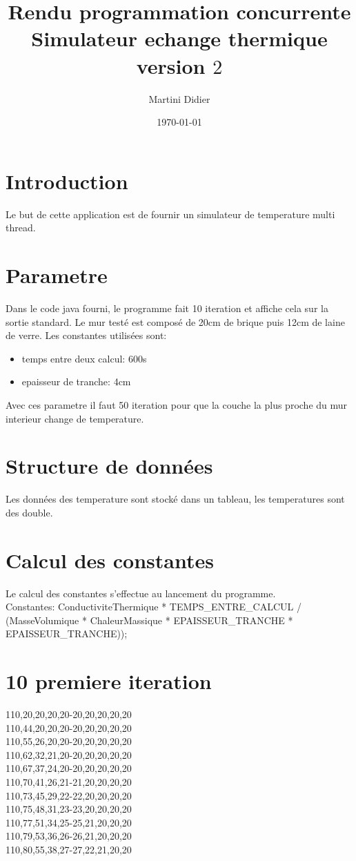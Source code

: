 \documentclass[11pt,a4paper]{article}
\title{Rendu programmation concurrente \\ Simulateur echange thermique version $2$}
\author{Martini Didier}
\date{\today}
\begin{document}
\maketitle

\section{Introduction}
Le but de cette application est de fournir un simulateur de temperature multi thread.

\section{Parametre}
Dans le code java fourni, le programme fait 10 iteration et affiche cela sur la sortie standard. 
Le mur testé est composé de 20cm de brique puis 12cm de laine de verre.
Les constantes utilisées sont:\\ 
\begin{itemize}
  \item temps entre deux calcul: 600s
  \item epaisseur de tranche: 4cm
\end{itemize}
Avec ces parametre il faut 50 iteration pour que la couche la plus proche du mur interieur change de temperature.\\
\section{Structure de données}
Les données des temperature sont stocké dans un tableau, les temperatures sont des double.\\
\section{Calcul des constantes}
Le calcul des constantes s'effectue au lancement du programme.\\ 
Constantes: ConductiviteThermique * TEMPS\_ENTRE\_CALCUL / (MasseVolumique * ChaleurMassique * EPAISSEUR\_TRANCHE * EPAISSEUR\_TRANCHE));\\

\section{10 premiere iteration}
110,20,20,20,20-20,20,20,20,20\\
110,44,20,20,20-20,20,20,20,20\\
110,55,26,20,20-20,20,20,20,20\\
110,62,32,21,20-20,20,20,20,20\\
110,67,37,24,20-20,20,20,20,20\\
110,70,41,26,21-21,20,20,20,20\\
110,73,45,29,22-22,20,20,20,20\\
110,75,48,31,23-23,20,20,20,20\\
110,77,51,34,25-25,21,20,20,20\\
110,79,53,36,26-26,21,20,20,20\\
110,80,55,38,27-27,22,21,20,20\\
\end{document}
